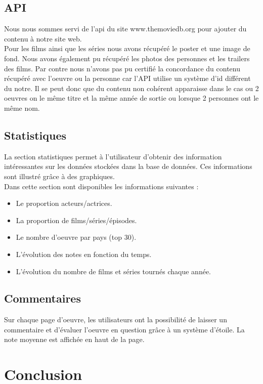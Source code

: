 \documentclass[10pt,a4paper]{article}
\begin{document}
\subsection{API}
Nous nous sommes servi de l'api du site www.themoviedb.org pour ajouter du contenu à notre site web. \\
Pour les films ainsi que les séries nous avons récupéré le poster et une image de fond. Nous avons également pu récupéré les photos des personnes et les trailers des films. Par contre nous n'avons pas pu certifié la concordance du contenu récupéré avec l'oeuvre ou la personne car l'API utilise un système d'id différent du notre. Il se peut donc que du contenu non cohérent apparaisse dans le cas ou 2 oeuvres on le même titre et la même année de sortie ou lorsque 2 personnes ont le même nom.

\newpage
\subsection{Statistiques}
La section statistiques permet à l'utilisateur d'obtenir des information intéressantes sur les données stockées dans la base de données. Ces informations sont illustré grâce à des graphiques. \\

Dans cette section sont disponibles les informations suivantes : 
\vskip 3pt
\begin{itemize}
\item Le proportion acteurs/actrices.
\item La proportion de films/séries/épisodes.
\item Le nombre d'oeuvre par pays (top 30).
\item L'évolution des notes en fonction du temps.
\item L'évolution du nombre de films et séries tournés chaque année.
\end{itemize}

\subsection{Commentaires}
Sur chaque page d'oeuvre, les utilisateurs ont la possibilité de laisser un commentaire et d'évaluer l'oeuvre en question grâce à un système d'étoile. La note moyenne est affichée en haut de la page.





\section{Conclusion}
\end{document}
